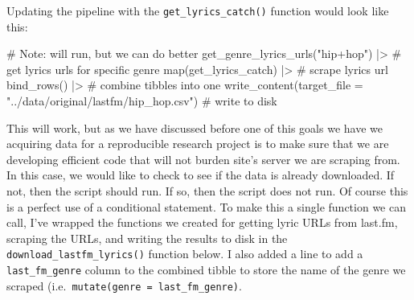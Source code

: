 \documentclass[
  letterpaper,
]{latex/krantz}
\newenvironment{Shaded}{\begin{snugshade}}{\end{snugshade}}
\newcommand{\AttributeTok}[1]{\textcolor[rgb]{0.40,0.45,0.13}{#1}}
\newcommand{\CommentTok}[1]{\textcolor[rgb]{0.37,0.37,0.37}{#1}}
\newcommand{\FunctionTok}[1]{\textcolor[rgb]{0.28,0.35,0.67}{#1}}
\newcommand{\NormalTok}[1]{\textcolor[rgb]{0.00,0.23,0.31}{#1}}
\newcommand{\SpecialCharTok}[1]{\textcolor[rgb]{0.37,0.37,0.37}{#1}}
\newcommand{\StringTok}[1]{\textcolor[rgb]{0.13,0.47,0.30}{#1}}
\begin{document}
Updating the pipeline with the \texttt{get\_lyrics\_catch()} function
would look like this:

\begin{Shaded}
\begin{Highlighting}[]
\CommentTok{\# Note: will run, but we can do better}
\FunctionTok{get\_genre\_lyrics\_urls}\NormalTok{(}\StringTok{"hip+hop"}\NormalTok{) }\SpecialCharTok{|\textgreater{}} \CommentTok{\# get lyrics urls for specific genre}
  \FunctionTok{map}\NormalTok{(get\_lyrics\_catch) }\SpecialCharTok{|\textgreater{}}  \CommentTok{\# scrape lyrics url}
  \FunctionTok{bind\_rows}\NormalTok{() }\SpecialCharTok{|\textgreater{}} \CommentTok{\# combine tibbles into one}
  \FunctionTok{write\_content}\NormalTok{(}\AttributeTok{target\_file =} \StringTok{"../data/original/lastfm/hip\_hop.csv"}\NormalTok{) }\CommentTok{\# write to disk}
\end{Highlighting}
\end{Shaded}

This will work, but as we have discussed before one of this goals we
have we acquiring data for a reproducible research project is to make
sure that we are developing efficient code that will not burden site's
server we are scraping from. In this case, we would like to check to see
if the data is already downloaded. If not, then the script should run.
If so, then the script does not run. Of course this is a perfect use of
a conditional statement. To make this a single function we can call,
I've wrapped the functions we created for getting lyric URLs from
last.fm, scraping the URLs, and writing the results to disk in the
\texttt{download\_lastfm\_lyrics()} function below. I also added a line
to add a \texttt{last\_fm\_genre} column to the combined tibble to store
the name of the genre we scraped
(i.e.~\texttt{mutate(genre\ =\ last\_fm\_genre)}.
\end{document}
